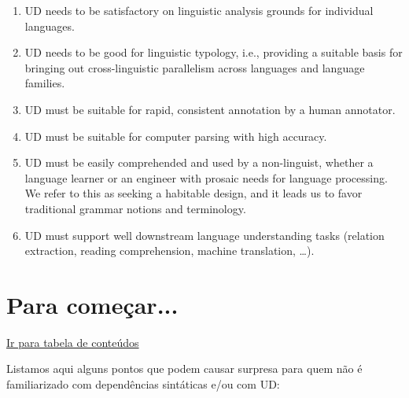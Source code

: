 \documentclass[output=paper,colorlinks,citecolor=brown]{langscibook}
\begin{document}
	\begin{enumerate}
		\item UD needs to be satisfactory on linguistic analysis grounds for individual languages.
		\item UD needs to be good for linguistic typology, i.e., providing a suitable basis for bringing out cross-linguistic parallelism across languages and language families.
		\item UD must be suitable for rapid, consistent annotation by a human annotator.
		\item UD must be suitable for computer parsing with high accuracy.
		\item UD must be easily comprehended and used by a non-linguist, whether a language learner or an engineer with prosaic needs for language processing. We refer to this as seeking a habitable design, and it leads us to favor traditional grammar notions and terminology.
		\item UD must support well downstream language understanding tasks (relation extraction, reading comprehension, machine translation, …).
	\end{enumerate}


\chapter{Para começar...}\label{sec:paracomecar}

	\hyperlink{toc}{Ir para tabela de conteúdos\\}

	Listamos aqui alguns pontos que podem causar surpresa para quem não é familiarizado com dependências sintáticas e/ou com UD:
	
\end{document}
